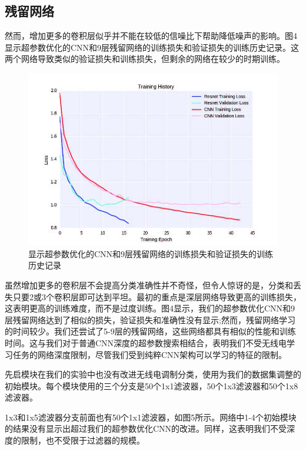 \subsection{残留网络}

然而，增加更多的卷积层似乎并不能在较低的信噪比下帮助降低噪声的影响。图4显示超参数优化的CNN和9层残留网络的训练损失和验证损失的训练历史记录。这两个网络导致类似的验证损失和训练损失，但剩余的网络在较少的时期训练。\par

\begin{figure}[!h]
	\centering
	\includegraphics[scale=1]{figures/chapter_5/fig4}
	\caption{显示超参数优化的CNN和9层残留网络的训练损失和验证损失的训练历史记录}
\end{figure}

虽然增加更多的卷积层不会提高分类准确性并不奇怪，但令人惊讶的是，分类和丢失只要2或3个卷积层即可达到平坦。最初的重点是深层网络导致更高的训练损失，这表明更高的训练难度，而不是过度训练。图4显示，我们的超参数优化CNN和9层残留网络达到了相似的损失，验证损失和准确性没有显示;然而，残留网络学习的时间较少。我们还尝试了5-9层的残留网络，这些网络都具有相似的性能和训练时间。这与我们对于普通CNN深度的超参数搜索相结合，表明我们不受无线电学习任务的网络深度限制，尽管我们受到纯粹CNN架构可以学习的特征的限制。\par

先启模块在我们的实验中也没有改进无线电调制分类，使用为我们的数据集调整的初始模块。每个模块使用的三个分支是50个1x1滤波器，50个1x3滤波器和50个1x8滤波器。\par
1x3和1x5滤波器分支前面也有50个1x1滤波器，如图5所示。网络中1-4个初始模块的结果没有显示出超过我们的超参数优化CNN的改进。同样，这表明我们不受深度的限制，也不受限于过滤器的规模。\par


